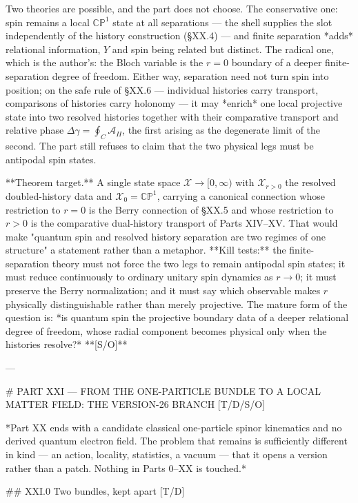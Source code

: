Two theories are possible, and the part does not choose. The conservative one: spin remains a local $\mathbb{CP}^1$ state at all separations — the shell supplies the slot independently of the history construction (§XX.4) — and finite separation *adds* relational information, $Y$ and spin being related but distinct. The radical one, which is the author's: the Bloch variable is the $r = 0$ boundary of a deeper finite-separation degree of freedom. Either way, separation need not turn spin into position; on the safe rule of §XX.6 — individual histories carry transport, comparisons of histories carry holonomy — it may *enrich* one local projective state into two resolved histories together with their comparative transport and relative phase $\Delta\gamma = \oint_C\mathcal A_H$, the first arising as the degenerate limit of the second. The part still refuses to claim that the two physical legs must be antipodal spin states.

**Theorem target.** A single state space $\mathcal X\to[0,\infty)$ with $\mathcal X_{r>0}$ the resolved doubled-history data and $\mathcal X_0 = \mathbb{CP}^1$, carrying a canonical connection whose restriction to $r = 0$ is the Berry connection of §XX.5 and whose restriction to $r>0$ is the comparative dual-history transport of Parts XIV–XV. That would make "quantum spin and resolved history separation are two regimes of one structure" a statement rather than a metaphor. **Kill tests:** the finite-separation theory must not force the two legs to remain antipodal spin states; it must reduce continuously to ordinary unitary spin dynamics as $r\to0$; it must preserve the Berry normalization; and it must say which observable makes $r$ physically distinguishable rather than merely projective. The mature form of the question is: *is quantum spin the projective boundary data of a deeper relational degree of freedom, whose radial component becomes physical only when the histories resolve?* **[S/O]**

---

# PART XXI — FROM THE ONE-PARTICLE BUNDLE TO A LOCAL MATTER FIELD: THE VERSION-26 BRANCH [T/D/S/O]

*Part XX ends with a candidate classical one-particle spinor kinematics and no derived quantum electron field. The problem that remains is sufficiently different in kind — an action, locality, statistics, a vacuum — that it opens a version rather than a patch. Nothing in Parts 0–XX is touched.*

## XXI.0 Two bundles, kept apart [T/D]

